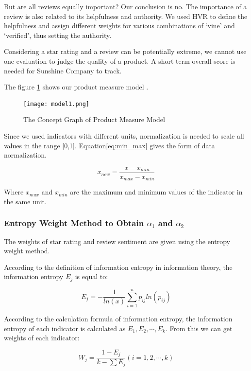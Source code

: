 \documentclass[12pt]{article}  %
\begin{document}
But are all reviews equally important? Our conclusion is no. The importance of a review is also related to its helpfulness and authority. We used HVR to define the helpfulness and assign different weights for various combinations of `vine' and `verified', thus setting the authority.

Considering a star rating and a review can be potentially extreme, we cannot use one evaluation to judge the quality of a product. A short term overall score is needed for Sunshine Company to track.

The figure \ref{fig:fig7} shows our product measure model .


\begin{figure}[htbp]
	\centering
	\texttt{[image: model1.png]}
	\caption{The Concept Graph of Product Measure Model}\label{fig:fig7}
\end{figure}

\newpage
Since we used indicators with different units, normalization is needed to scale all values in the range [0,1]. Equation\ref{eq:min_max} gives the form of data normalization.

\begin{equation}\label{eq:min_max}
x_{new}=\frac{x-x_{min}}{x_{max}-x_{min}}
\end{equation}

Where $x_{max}$ and $x_{min}$ are the maximum and minimum values of the indicator in the same unit.

\subsubsection{Entropy Weight Method to Obtain $\alpha_1$ and $\alpha_2$}

The weights of star rating and review sentiment are given using the entropy weight method.

According to the definition of information entropy in information theory, the information entropy $E_j$ is equal to:

\begin{equation}\label{eq:entropy}
E_j =-\frac{1}{ln(x)}\sum\limits_{i=1}^{n}p_{ij}ln(p_{ij})
\end{equation}

According to the calculation formula of information entropy, the information entropy of each indicator is calculated as $E_1, E_2, \cdots, E_k$. From this we can get weights of each indicator:

\begin{equation}
W_j=\frac{1-E_j}{k-\sum E_j}(i=1,2,\cdots,k)
\end{equation}
\end{document}

